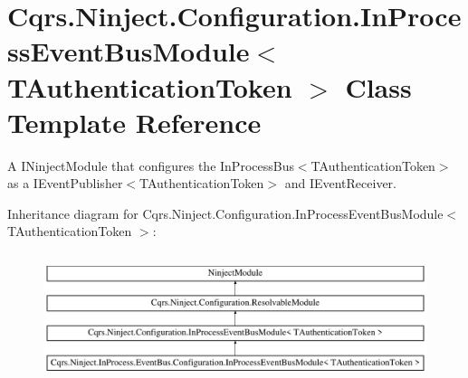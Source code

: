 \hypertarget{classCqrs_1_1Ninject_1_1Configuration_1_1InProcessEventBusModule}{}\section{Cqrs.\+Ninject.\+Configuration.\+In\+Process\+Event\+Bus\+Module$<$ T\+Authentication\+Token $>$ Class Template Reference}
\label{classCqrs_1_1Ninject_1_1Configuration_1_1InProcessEventBusModule}


A I\+Ninject\+Module that configures the In\+Process\+Bus$<$\+T\+Authentication\+Token$>$ as a I\+Event\+Publisher$<$\+T\+Authentication\+Token$>$ and I\+Event\+Receiver.  


Inheritance diagram for Cqrs.\+Ninject.\+Configuration.\+In\+Process\+Event\+Bus\+Module$<$ T\+Authentication\+Token $>$\+:\begin{figure}[H]
\begin{center}
\leavevmode
\includegraphics[height=3.822526cm]{classCqrs_1_1Ninject_1_1Configuration_1_1InProcessEventBusModule}
\end{center}
\end{figure}
